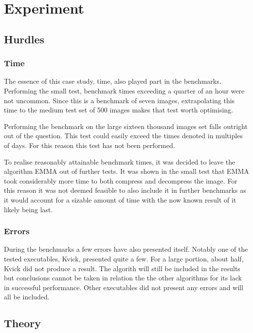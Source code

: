 \documentclass[11pt,a4paper]{report}
\begin{document}
\newpage

\chapter{Experiment}

\section{Hurdles}

\subsection{Time}

The essence of this case study, time, also played part in the benchmarks. Performing the small test, benchmark times exceeding a quarter of an hour were not uncommon. Since this is a benchmark of seven images, extrapolating this time to the medium test set of 500 images makes that test worth optimising.

Performing the benchmark on the large sixteen thousand images set falls outright out of the question. This test could easily exceed the times denoted in multiples of days. For this reason this test has not been performed.

To realise reasonably attainable benchmark times, it was decided to leave the algorithm EMMA out of further tests. It was shown in the small test that EMMA took considerably more time to both compress and decompress the image. For this reason it was not deemed feasible to also include it in further benchmarks as it would account for a sizable amount of time with the now known result of it likely being last.

\subsection{Errors}

During the benchmarks a few errors have also presented itself.
Notably one of the tested executables, Kvick, presented quite a few. For a large portion, about half, Kvick did not produce a result. The algorith will still be included in the results but conclusions cannot be taken in relation the the other algorithms for its lack in successful performance. Other executables did not present any errors and will all be included.

\section{Theory}
\end{document}
